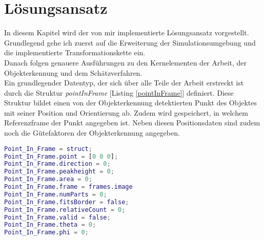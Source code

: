 \section{Lösungsansatz}
In diesem Kapitel wird der von mir implementierte Lösungsansatz vorgestellt. Grundlegend gehe ich zuerst auf die Erweiterung der Simulationsumgebung und die implementierte Transformationskette ein.\\
Danach folgen genauere Ausführungen zu den Kernelementen der Arbeit, der Objekterkennung und dem Schätzverfahren.\\

Ein grundlegender Datentyp, der sich über alle Teile der Arbeit erstreckt ist durch die Struktur \textit{pointInFrame} [Listing \ref{pointInFrame}] definiert. Diese Struktur bildet einen von der Objekterkennung detektierten Punkt des Objektes mit seiner Position und Orientierung ab. Zudem wird gespeichert, in welchem Referenzframe der Punkt angegeben ist. Neben diesen Positionsdaten sind zudem noch die Gütefaktoren der Objekterkennung angegeben. 

\begin{lstlisting}[language=Matlab,caption=\textit{pointInFrame} Struktur Initialisierung, label = pointInFrame]
Point_In_Frame = struct;
Point_In_Frame.point = [0 0 0];
Point_In_Frame.direction = 0;
Point_In_Frame.peakheight = 0;
Point_In_Frame.area = 0;
Point_In_Frame.frame = frames.image
Point_In_Frame.numParts = 0;
Point_In_Frame.fitsBorder = false;
Point_In_Frame.relativeCount = 0;
Point_In_Frame.valid = false;
Point_In_Frame.theta = 0;
Point_In_Frame.phi = 0;
\end{lstlisting}